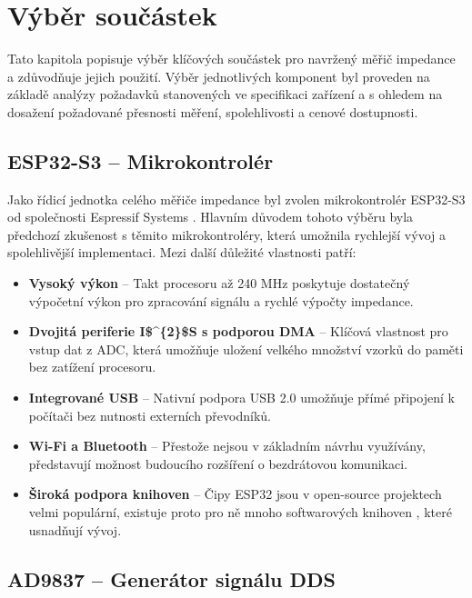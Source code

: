 \section{Výběr součástek}

Tato kapitola popisuje výběr klíčových součástek pro navržený měřič impedance a zdůvodňuje jejich použití.
Výběr jednotlivých komponent byl proveden na základě analýzy požadavků stanovených ve specifikaci 
zařízení a s ohledem na dosažení požadované přesnosti měření, spolehlivosti a cenové dostupnosti.

\subsection{ESP32-S3 -- Mikrokontrolér}

Jako řídicí jednotka celého měřiče impedance byl zvolen mikrokontrolér ESP32-S3 od společnosti Espressif Systems \cite{ESP32S3_Datasheet,ESP32S3_HardwareDesign}.
Hlavním důvodem tohoto výběru byla předchozí zkušenost s těmito mikrokontroléry, která umožnila 
rychlejší vývoj a spolehlivější implementaci. Mezi další důležité vlastnosti patří:

\begin{itemize}
    \item \textbf{Vysoký výkon} -- Takt procesoru až 240 MHz poskytuje dostatečný výpočetní výkon pro 
    zpracování signálu a rychlé výpočty impedance.
    \item \textbf{Dvojitá periferie \acs{I$^{2}$S} s podporou \acs{DMA}} -- Klíčová vlastnost pro vstup dat 
    z \acs{ADC}, která umožňuje uložení velkého množství vzorků do paměti bez zatížení procesoru.
    \item \textbf{Integrované USB} -- Nativní podpora USB 2.0 umožňuje přímé připojení k počítači 
    bez nutnosti externích převodníků.
    \item \textbf{Wi-Fi a Bluetooth} -- Přestože nejsou v základním návrhu využívány, představují 
    možnost budoucího rozšíření o bezdrátovou komunikaci.
    \item \textbf{Široká podpora knihoven} -- Čipy ESP32 jsou v open-source projektech velmi populární, existuje proto pro ně mnoho softwarových knihoven
    , které usnadňují vývoj.
\end{itemize}


\subsection{AD9837 -- Generátor signálu DDS}

